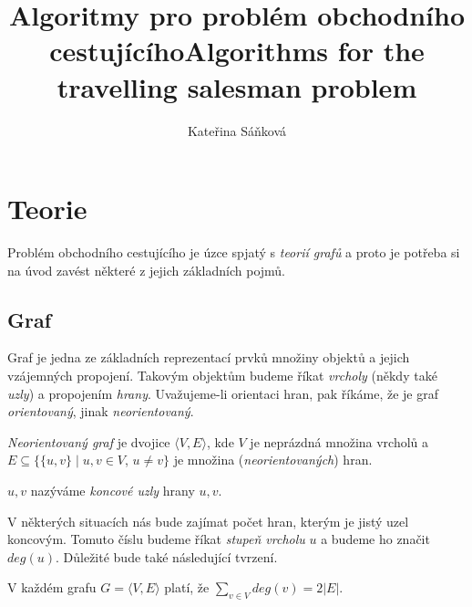 \documentclass[
  printversion=false,
  joinlists=true,
  glossaries=true,
  figures=true,
  tables=true,
  sourcecodes=false,
  theorems=false,
  bibencoding=utf8,
  language=czech,
  encoding=utf8,
  program=infpvs,
  index=true,
  biblatex=true
]{kidiplom}
\title{Algoritmy pro problém obchodního cestujícího}
\title[english]{Algorithms for the travelling salesman problem}
\author{Kateřina Sáňková}
\begin{document}
\maketitle



\newcommand{\BibLaTeX}{\textsc{Bib}\LaTeX}

\section{Teorie}
Problém obchodního cestujícího je úzce spjatý s \textit{teorií grafů} a proto je potřeba si na úvod zavést některé z jejich základních pojmů.

\subsection{Graf}
Graf je jedna ze základních reprezentací prvků množiny objektů a jejich vzájemných propojení. Takovým objektům budeme říkat \textit{vrcholy} (někdy také \textit{uzly}) a propojením \textit{hrany}. Uvažujeme-li orientaci hran, pak říkáme, že je graf \textit{orientovaný}, jinak \textit{neorientovaný}.

\begin{definition}
\textit{Neorientovaný graf} je dvojice $\langle V, E \rangle$, kde $V$ je neprázdná množina vrcholů a $E \subseteq \{\{u, v\} \mid u, v \in V$, $u \neq v \}$ je množina (\textit{neorientovaných}) hran.

$u, v$ nazýváme \textit{koncové uzly} hrany ${u, v}$.
\end{definition}
 
V některých situacích nás bude zajímat počet hran, kterým je jistý uzel koncovým. Tomuto číslu budeme říkat \textit{stupeň vrcholu} $u$ a budeme ho značit $deg(u)$. Důležité bude také následující tvrzení.

\begin{theorem}\label{theorem:degree}
V každém grafu $G=\langle V, E \rangle$ platí, že $\sum_{v \in V} deg(v) = 2 |E|$.
\end{theorem}
\end{document}
